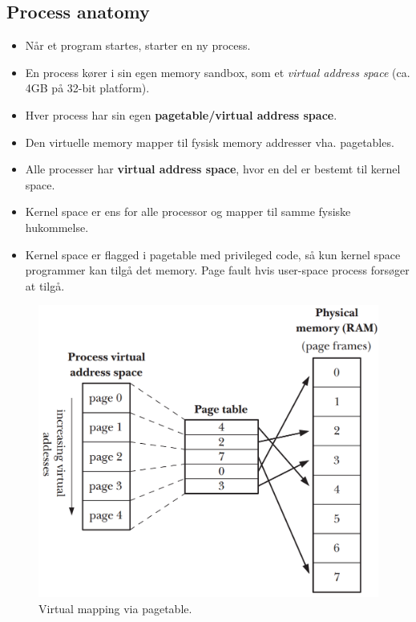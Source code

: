 \subsection{Process anatomy}
\begin{itemize}
	\item Når et program startes, starter en ny process.
	\item En process kører i sin egen memory sandbox, som et \textit{virtual address space} (ca. 4GB på 32-bit platform).
	\item Hver process har sin egen \textbf{pagetable/virtual address space}.
	\item Den virtuelle memory mapper til fysisk memory addresser vha. pagetables.
	\item Alle processer har \textbf{virtual address space}, hvor en del er bestemt til kernel space.
	\item Kernel space er ens for alle processor og mapper til samme fysiske hukommelse.
	\item Kernel space er flagged i pagetable med privileged code, så kun kernel space programmer kan tilgå det memory. Page fault  hvis user-space process forsøger at tilgå.
\end{itemize}

\begin{figure}[h]
	\centering
	\includegraphics[width=0.7\linewidth]{figs/pagetable}
	\caption{Virtual mapping via pagetable.}
	\label{fig:pagetable}
\end{figure}

